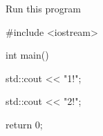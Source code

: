 Run this program

\begin{console}

#include <iostream>



int main()

{

    std::cout << "1!\n";

    std::cout << "2!\n";



    return 0;

}

\end{console}

